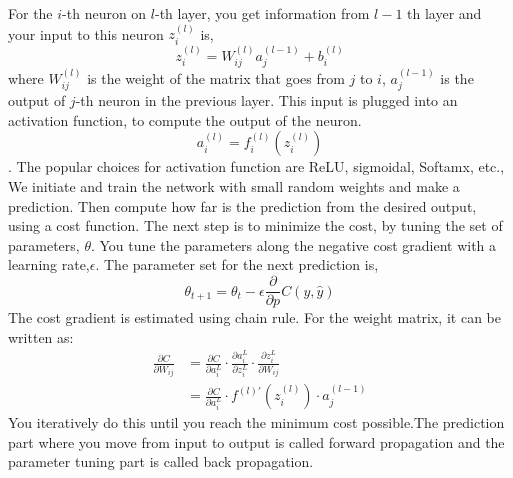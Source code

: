 \documentclass{article}
\begin{document}
For the $i$-th neuron on $l$-th layer, you get information from $l-1$ th layer and your input to this neuron $z^(l)_i$ is,
\[z^{(l)}_i = W^{(l)}_{ij}a_j^{(l-1)}+b^{(l)}_i\] 
where $W^{(l)}_{ij}$ is the weight of the matrix that goes from $j$ to $i$, $a_j^{(l-1)}$ is the output of $j$-th neuron in the 
previous layer. This input is plugged into an activation function, to compute the output of the neuron.
\[a^{(l)}_i = f^{(l)}_i(z^{(l)}_i)\].
The popular choices for activation function are ReLU, sigmoidal, Softamx, etc.,
We initiate and train the network with small random weights and make a prediction. Then compute how far is the prediction from the 
desired output, using a cost function. The next step is to minimize the cost, by tuning the set of parameters, $\theta$. You tune the parameters
along the negative cost gradient with a learning rate,$\epsilon$. The parameter set for the next prediction is,
\[\theta_{t+1} = \theta_t - \epsilon \frac{\partial}{\partial p} C(y, \hat{y})\] 
The cost gradient is estimated using chain rule. For the weight matrix, it can be written as:
\begin{align}
\frac{\partial C}{\partial W_{ij}} &= \frac{\partial C}{\partial a^L_i}\cdot \frac{\partial a^L_i}{\partial z^L_i}\cdot  \frac{\partial z^L_i}{\partial W_{ij}}\\
    & = \frac{\partial C}{\partial a^L_i}\cdot f^{(l)'}(z^{(l)}_i) \cdot a^{(l-1)}_j
\end{align}
You iteratively do this until you reach the minimum cost possible.The prediction part where you move from input to output is called forward propagation 
and the parameter tuning part is called back propagation. 
\end{document}
